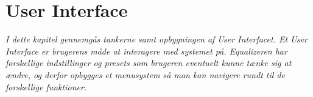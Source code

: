 \chapter{User Interface}\label{kap:ui}

\emph{I dette kapitel gennemgås tankerne samt opbygningen af User Interfacet. Et User Interface er brugerens måde at interagere med systemet på. Equalizeren har forskellige indstillinger og presets som brugeren eventuelt kunne tænke sig at ændre, og derfor opbygges et menusystem så man kan navigere rundt til de forskellige funktioner.}